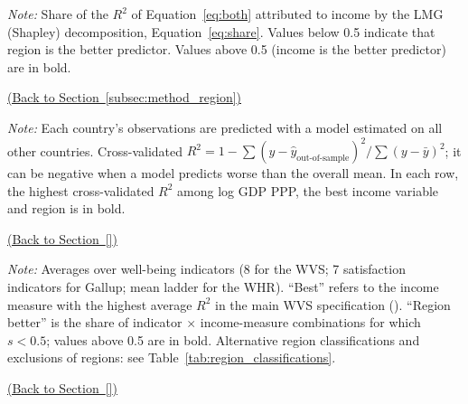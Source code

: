 \documentclass[11pt]{article}
\providecommand{\backlink}[2]{\if\relax\detokenize{#2}\relax\else\hfill\hyperref[#2]{(Back to Section~\ref*{#2})}\fi}
\begin{document}
\begin{table}[p]
    \centering
    \caption{Share of explained variance due to income rather than region (LMG), WVS/EVS 1981--2023.}\label{tab:share_income}
    \begin{adjustbox}{max width=\textwidth}
    
    \end{adjustbox}
    \begin{minipage}{\textwidth}\footnotesize \textit{Note:} Share of the $R^2$ of Equation~\eqref{eq:both} attributed to income by the LMG (Shapley) decomposition, Equation~\eqref{eq:share}. Values below 0.5 indicate that region is the better predictor. Values above 0.5 (income is the better predictor) are in bold.\end{minipage}
    {\footnotesize\backlink{tab:share_income}{subsec:method_region}\par}
\end{table}

\begin{table}[p]
    \centering
    \caption{Out-of-sample predictive capacity: leave-one-country-out cross-validated $R^2$.}\label{tab:cv}
    \begin{adjustbox}{max width=\textwidth}
    
    \end{adjustbox}
    \begin{minipage}{\textwidth}\footnotesize \textit{Note:} Each country's observations are predicted with a model estimated on all other countries. Cross-validated $R^2 = 1 - \sum (y - \hat y_{\text{out-of-sample}})^2 / \sum (y - \bar y)^2$; it can be negative when a model predicts worse than the overall mean. In each row, the highest cross-validated $R^2$ among log GDP PPP, the best income variable and region is in bold.\end{minipage}
    {\footnotesize\backlink{tab:cv}{}\par}
\end{table}

\begin{table}[p]
    \centering
    \caption{Robustness: income vs.\ region across specifications and datasets.}\label{tab:robustness}
    \begin{adjustbox}{max width=\textwidth}
    
    \end{adjustbox}
    \begin{minipage}{\textwidth}\footnotesize \textit{Note:} Averages over well-being indicators (8 for the WVS; 7 satisfaction indicators for Gallup; mean ladder for the WHR). ``Best'' refers to the income measure with the highest average $R^2$ in the main WVS specification (\bestIncome). ``Region better'' is the share of indicator $\times$ income-measure combinations for which $s < 0.5$; values above 0.5 are in bold. Alternative region classifications and exclusions of regions: see Table~\ref{tab:region_classifications}.\end{minipage}
    {\footnotesize\backlink{tab:robustness}{}\par}
\end{table}
\end{document}
